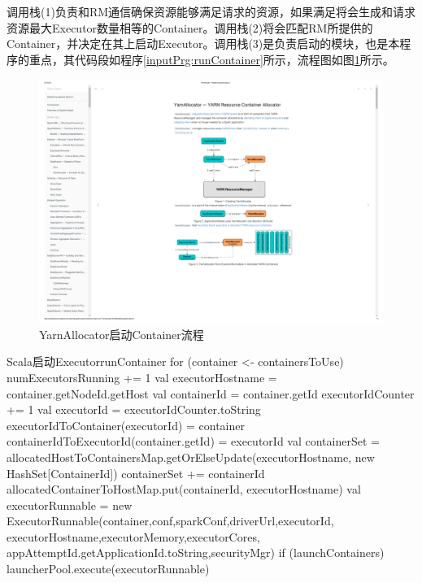 调用栈(1)负责和RM通信确保资源能够满足请求的资源，如果满足将会生成和请求资源最大Executor数量相等的Container。调用栈(2)将会匹配RM所提供的Container，并决定在其上启动Executor。调用栈(3)是负责启动的模块，也是本程序的重点，其代码段如程序\ref{inputPrg:runContainer}所示，流程图如图\ref{fig:runContainer}所示。
\begin{figure}[H] 
	\centering
	\includegraphics[width=\textwidth]{figures/YarnAllocator.pdf}
	\caption{YarnAllocator启动Container流程}
	\label{fig:runContainer}
\end{figure}
\begin{codeInput}{Scala}{启动Executor}{runContainer}
for (container <- containersToUse) {
  numExecutorsRunning += 1
  val executorHostname = container.getNodeId.getHost
  val containerId = container.getId
  executorIdCounter += 1
  val executorId = executorIdCounter.toString
  executorIdToContainer(executorId) = container
  containerIdToExecutorId(container.getId) = executorId	
  val containerSet = allocatedHostToContainersMap.getOrElseUpdate(executorHostname,
    new HashSet[ContainerId])	
  containerSet += containerId
  allocatedContainerToHostMap.put(containerId, executorHostname)	
  val executorRunnable = new ExecutorRunnable(container,conf,sparkConf,driverUrl,executorId,
  executorHostname,executorMemory,executorCores,
  appAttemptId.getApplicationId.toString,securityMgr)
  if (launchContainers) {
    launcherPool.execute(executorRunnable)
  }
}
\end{codeInput}

